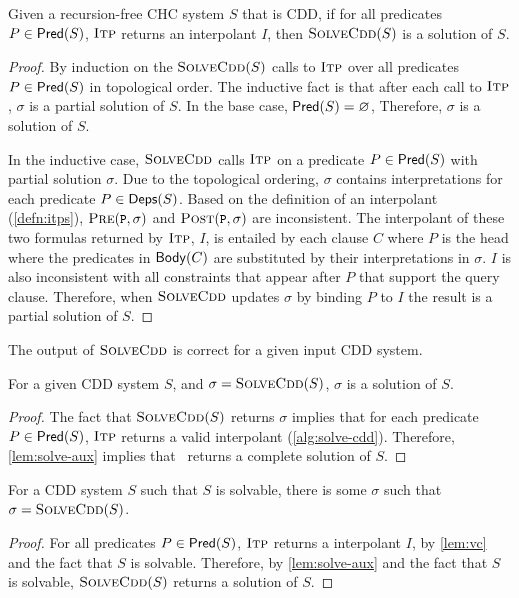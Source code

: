 \begin{lem}
  \label{lem:solve-aux}
  Given a recursion-free CHC system $S$ that is CDD, if for all
  predicates $P \in \mathsf{Pred}( S )$,
  $\textsc{Itp}$ returns
  an interpolant $I$, then $\textsc{SolveCdd}(S)$ is a solution of $S$.
\end{lem}
%
\begin{proof}
  By induction on the $\textsc{SolveCdd}(S)$ calls to $\textsc{Itp}$ over all
  predicates $P \in \mathsf{Pred}( S )$
  in topological order.
  The inductive fact is that after each call to $\textsc{Itp}$, $\sigma$
  is a partial solution of $S$.
  In the base case, $\mathsf{Pred}( S ) = \varnothing$,
  Therefore, $\sigma$ is a solution of $S$.

  In the inductive case, $\textsc{SolveCdd}$ calls $\textsc{Itp}$ on a predicate
  $P \in \mathsf{Pred}( S )$ with partial solution $\sigma$.  Due to the
  topological ordering, $\sigma$ contains interpretations for each
  predicate $P \in \mathsf{Deps}(S)$.
  Based on the definition of an interpolant (\autoref{defn:itps}),
  $\prectr(\cc{P},\sigma)$ and $\postctr(\cc{P},\sigma)$ are
  inconsistent.
  The interpolant of these two formulas returned by $\textsc{Itp}$, $I$,
  is entailed by each clause $C$ where $P$ is the head where the
  predicates in $\mathsf{Body}(C)$ are substituted by their interpretations
  in $\sigma$.
  $I$ is also inconsistent with all constraints that appear after $P$
  that support the query clause.
  Therefore, when $\textsc{SolveCdd}$ updates $\sigma$ by binding $P$ to $I$
  the result is a partial solution of $S$.
\end{proof}

The output of $\textsc{SolveCdd}$ is correct for a given input CDD system.
%
\begin{lem}
  \label{lem:cdd-soln-sound}
  For a given CDD system $S$, and $\sigma = \textsc{SolveCdd}(S)$, %
  $\sigma$ is a solution of $S$.
\end{lem}
%
\begin{proof}
  The fact that $\textsc{SolveCdd}(S)$ returns $\sigma$ implies that for each
  predicate $P \in \mathsf{Pred}( S )$,
  $\textsc{Itp}$ returns
  a valid interpolant (\autoref{alg:solve-cdd}).
  Therefore, \autoref{lem:solve-aux} implies that \solvecdd~returns a
  complete solution of $S$.
\end{proof}

\begin{lem}
  \label{lem:cdd-soln-complete}
  For a CDD system $S$ such that $S$ is
  solvable, %
  there is some $\sigma$ such that %
  $\sigma = \textsc{SolveCdd}(S)$.
\end{lem}
%
\begin{proof}
  For all predicates $P \in \mathsf{Pred}( S )$, $\textsc{Itp}$ returns a
  interpolant $I$, by
  \autoref{lem:vc} and the fact that $S$ is solvable.
  Therefore, by \autoref{lem:solve-aux} and the fact that
  $S$ is solvable, $\textsc{SolveCdd}(S)$ returns a
  solution of $S$.
\end{proof}

